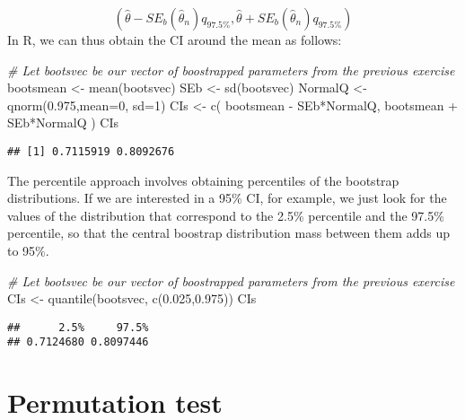 \documentclass[
]{book}
\newenvironment{Shaded}{\begin{snugshade}}{\end{snugshade}}
\newcommand{\AttributeTok}[1]{\textcolor[rgb]{0.77,0.63,0.00}{#1}}
\newcommand{\CommentTok}[1]{\textcolor[rgb]{0.56,0.35,0.01}{\textit{#1}}}
\newcommand{\DecValTok}[1]{\textcolor[rgb]{0.00,0.00,0.81}{#1}}
\newcommand{\FloatTok}[1]{\textcolor[rgb]{0.00,0.00,0.81}{#1}}
\newcommand{\FunctionTok}[1]{\textcolor[rgb]{0.00,0.00,0.00}{#1}}
\newcommand{\NormalTok}[1]{#1}
\newcommand{\OtherTok}[1]{\textcolor[rgb]{0.56,0.35,0.01}{#1}}
\newcommand{\SpecialCharTok}[1]{\textcolor[rgb]{0.00,0.00,0.00}{#1}}
\begin{document}
\[(\hat{\theta} - SE_b(\hat{\theta}_n)q_{97.5\%}, \hat{\theta} + SE_b(\hat{\theta}_n)q_{97.5\%})\]
In R, we can thus obtain the CI around the mean as follows:

\begin{Shaded}
\begin{Highlighting}[]
\CommentTok{\# Let bootsvec be our vector of boostrapped parameters from the previous exercise}
\NormalTok{bootsmean }\OtherTok{\textless{}{-}} \FunctionTok{mean}\NormalTok{(bootsvec)}
\NormalTok{SEb }\OtherTok{\textless{}{-}} \FunctionTok{sd}\NormalTok{(bootsvec)}
\NormalTok{NormalQ }\OtherTok{\textless{}{-}} \FunctionTok{qnorm}\NormalTok{(}\FloatTok{0.975}\NormalTok{,}\AttributeTok{mean=}\DecValTok{0}\NormalTok{, }\AttributeTok{sd=}\DecValTok{1}\NormalTok{)}
\NormalTok{CIs }\OtherTok{\textless{}{-}} \FunctionTok{c}\NormalTok{( bootsmean }\SpecialCharTok{{-}}\NormalTok{ SEb}\SpecialCharTok{*}\NormalTok{NormalQ, bootsmean }\SpecialCharTok{+}\NormalTok{ SEb}\SpecialCharTok{*}\NormalTok{NormalQ )}
\NormalTok{CIs}
\end{Highlighting}
\end{Shaded}

\begin{verbatim}
## [1] 0.7115919 0.8092676
\end{verbatim}

The percentile approach involves obtaining percentiles of the bootstrap distributions. If we are interested in a 95\% CI, for example, we just look for the values of the distribution that correspond to the 2.5\% percentile and the 97.5\% percentile, so that the central boostrap distribution mass between them adds up to 95\%.

\begin{Shaded}
\begin{Highlighting}[]
\CommentTok{\# Let bootsvec be our vector of boostrapped parameters from the previous exercise}
\NormalTok{CIs }\OtherTok{\textless{}{-}} \FunctionTok{quantile}\NormalTok{(bootsvec, }\FunctionTok{c}\NormalTok{(}\FloatTok{0.025}\NormalTok{,}\FloatTok{0.975}\NormalTok{))}
\NormalTok{CIs}
\end{Highlighting}
\end{Shaded}

\begin{verbatim}
##      2.5%     97.5% 
## 0.7124680 0.8097446
\end{verbatim}

\hypertarget{permutation-test}{%
\section{Permutation test}\label{permutation-test}}
\end{document}
